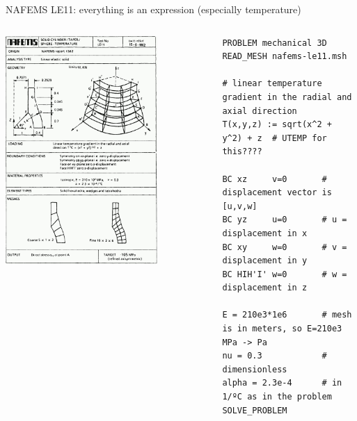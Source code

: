 \documentclass[
  ignorenonframetext,
  aspectratio=169,
]{beamer}
\begin{document}
\begin{frame}[fragile]{NAFEMS LE11: everything is an expression
(especially temperature)}
\protect\hypertarget{nafems-le11-everything-is-an-expression-especially-temperature}{}
\begin{columns}[T]
\begin{column}{0.5\textwidth}
\centering \includegraphics[width=0.75\textwidth,height=\textheight]{nafems-le11.png}
\end{column}

\pause

\begin{column}{0.5\textwidth}
\begin{lstlisting}[style=feenox]
PROBLEM mechanical 3D
READ_MESH nafems-le11.msh

# linear temperature gradient in the radial and axial direction
T(x,y,z) := sqrt(x^2 + y^2) + z  # UTEMP for this????

BC xz     v=0       # displacement vector is [u,v,w]
BC yz     u=0       # u = displacement in x
BC xy     w=0       # v = displacement in y
BC HIH'I' w=0       # w = displacement in z

E = 210e3*1e6       # mesh is in meters, so E=210e3 MPa -> Pa
nu = 0.3            # dimensionless
alpha = 2.3e-4      # in 1/ºC as in the problem
SOLVE_PROBLEM


\end{lstlisting}
\end{column}
\end{columns}
\end{frame}
\end{document}
